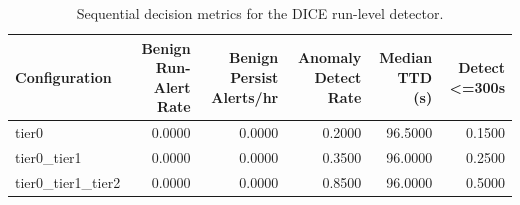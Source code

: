 \begin{table}[t]
\centering
\caption{Sequential decision metrics for the DICE run-level detector.}
\label{tab:dice_sequential_metrics}
\footnotesize
\begin{tabular}{lrrrrr}
\toprule
Configuration & Benign Run-Alert Rate & Benign Persist Alerts/hr & Anomaly Detect Rate & Median TTD (s) & Detect <=300s \\
\midrule
tier0 & 0.0000 & 0.0000 & 0.2000 & 96.5000 & 0.1500 \\
tier0_tier1 & 0.0000 & 0.0000 & 0.3500 & 96.0000 & 0.2500 \\
tier0_tier1_tier2 & 0.0000 & 0.0000 & 0.8500 & 96.0000 & 0.5000 \\
\bottomrule
\end{tabular}

\end{table}
